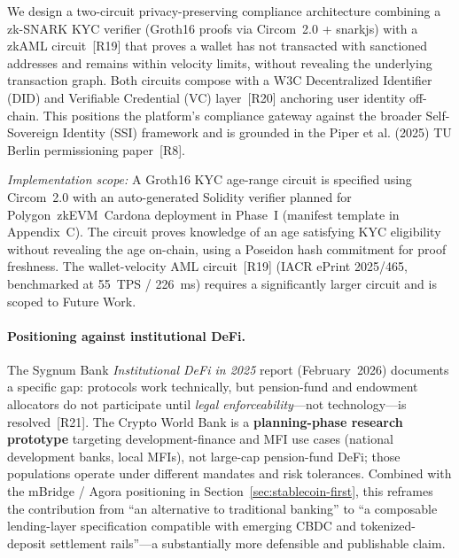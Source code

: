 \documentclass[12pt,a4paper]{report}
\begin{document}
\begin{description}[leftmargin=0pt]
\item[\textbf{Contribution 4 --- Compliance-Aware ZKP / zkAML Identity Pathway.}]
We design a two-circuit privacy-preserving compliance architecture combining a zk-SNARK KYC verifier (Groth16 proofs via Circom~2.0 + snarkjs) with a zkAML circuit~[R19] that proves a wallet has not transacted with sanctioned addresses and remains within velocity limits, without revealing the underlying transaction graph. Both circuits compose with a W3C Decentralized Identifier (DID) and Verifiable Credential (VC) layer~[R20] anchoring user identity off-chain. This positions the platform's compliance gateway against the broader Self-Sovereign Identity (SSI) framework and is grounded in the Piper et al. (2025) TU Berlin permissioning paper~[R8].

\textit{Implementation scope:} A Groth16 KYC age-range circuit is specified using Circom~2.0 with an auto-generated Solidity verifier planned for Polygon~zkEVM~Cardona deployment in Phase~I (manifest template in Appendix~C). The circuit proves knowledge of an age satisfying KYC eligibility without revealing the age on-chain, using a Poseidon hash commitment for proof freshness. The wallet-velocity AML circuit~[R19] (IACR ePrint 2025/465, benchmarked at 55~TPS / 226~ms) requires a significantly larger circuit and is scoped to Future Work.

\end{description}

\paragraph{Positioning against institutional DeFi.}
The Sygnum Bank \textit{Institutional DeFi in 2025} report (February~2026) documents a specific gap: protocols work technically, but pension-fund and endowment allocators do not participate until \textit{legal enforceability}---not technology---is resolved~[R21]. The Crypto World Bank is a \textbf{planning-phase research prototype} targeting development-finance and MFI use cases (national development banks, local MFIs), not large-cap pension-fund DeFi; those populations operate under different mandates and risk tolerances. Combined with the mBridge / Agora positioning in Section~\ref{sec:stablecoin-first}, this reframes the contribution from ``an alternative to traditional banking'' to ``a composable lending-layer specification compatible with emerging CBDC and tokenized-deposit settlement rails''---a substantially more defensible and publishable claim.
\end{document}
